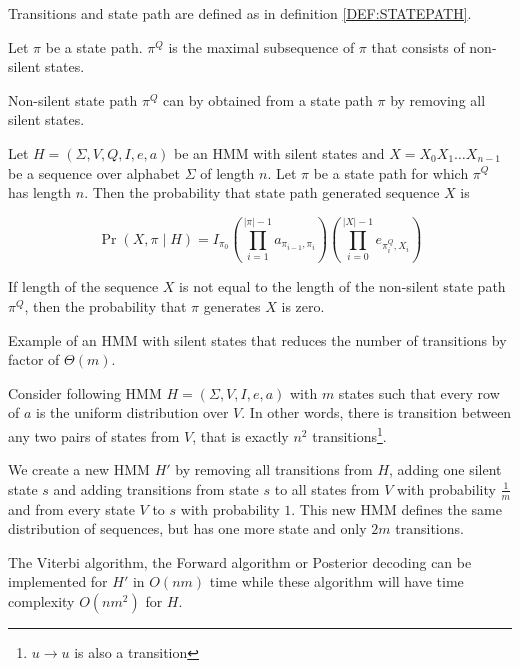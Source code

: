 \begin{definition}
Transitions and state path are defined as in definition \ref{DEF:STATEPATH}. 

Let $\pi$ be a state path.  $\pi^Q$ is
the maximal subsequence of $\pi$ that consists of non-silent states.
\end{definition}

\begin{note}
Non-silent state path $\pi^Q$ can by obtained from a state path $\pi$ by removing all silent
states.
\end{note}

\begin{definition}
Let $H=(\Sigma,V,Q,I,e,a)$ be an HMM with silent states and $X=X_0X_1\dots
X_{n-1}$ be a sequence over
alphabet $\Sigma$ of length $n$. Let $\pi$ be a state path for which $\pi^Q$ has
length $n$. Then the probability that state path generated sequence $X$ is 

\[\Pr\left(X,\pi\mid H\right) =
I_{\pi_0}\left(\prod_{i=1}^{|\pi|-1}a_{\pi_{i-1},\pi_i}\right)\left(\prod_{i=0}^{|X|-1}e_{\pi^Q_i,X_i}\right)\]

If length of the sequence $X$ is not equal to the length of the non-silent state
path $\pi^Q$, then the
probability that $\pi$ generates $X$ is zero.
\end{definition}

\begin{example}
Example of an HMM with silent states that reduces the number of transitions by factor
of $\Theta(m)$.

Consider following HMM $H=(\Sigma,V,I,e,a)$ with $m$ states such that every row
of $a$ is the uniform distribution over $V$. In other words, there is transition
between any two pairs of states from $V$, that is exactly $n^2$
transitions\footnote{$u\to u$ is also a transition}.

We create a new HMM $H'$ by removing all transitions from $H$, adding one silent
state $s$ and adding transitions
from state $s$ to all states from $V$ with probability $\frac1m$  and from every
state $V$ to $s$ with probability $1$. This new HMM
defines the same distribution of sequences, but has one more state and only $2m$
transitions. 

The Viterbi algorithm, the Forward algorithm or Posterior decoding can be
implemented for $H'$ in $O(nm)$ time while these algorithm will have time
complexity $O(nm^2)$ for $H$.
\end{example}


